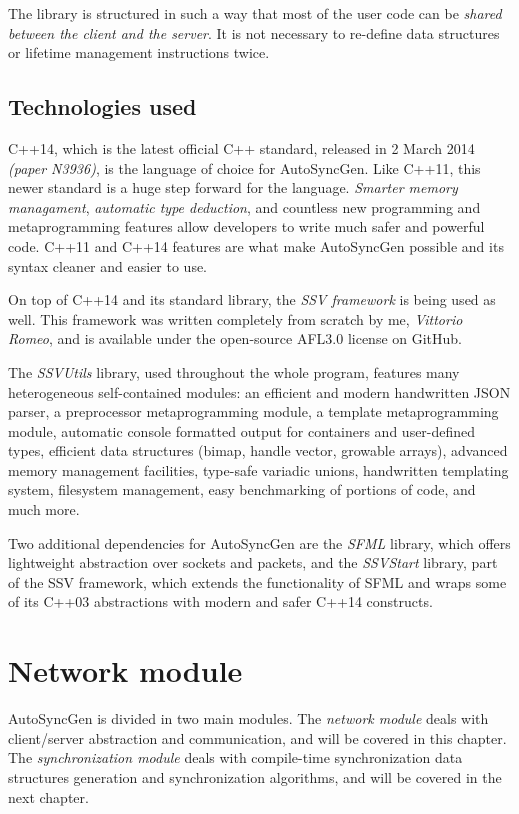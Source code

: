 \documentclass{report}
\begin{document}
            The library is structured in such a way that most of the user code can be \emph{shared between the client and the server}. 
            It is not necessary to re-define data structures or lifetime management instructions twice.

        \section{Technologies used}
            C++14, which is the latest official C++ standard, released in 2 March 2014 \emph{(paper N3936)}, is the language of choice for AutoSyncGen.
            Like C++11, this newer standard is a huge step forward for the language. \emph{Smarter memory managament}, \emph{automatic type deduction}, and countless new programming and metaprogramming features allow developers to write much safer and powerful code.
            C++11 and C++14 features are what make AutoSyncGen possible and its syntax cleaner and easier to use.

            On top of C++14 and its standard library, the \emph{SSV framework} is being used as well. This framework was written completely from scratch by me, \emph{Vittorio Romeo}, and is available under the open-source AFL3.0 license on GitHub.

            The \emph{SSVUtils} library, used throughout the whole program, features many heterogeneous self-contained modules: an efficient and modern handwritten JSON parser, a preprocessor metaprogramming module, a template metaprogramming module, automatic console formatted output for containers and user-defined types, efficient data structures (bimap, handle vector, growable arrays), advanced memory management facilities, type-safe variadic unions, handwritten templating system, filesystem management, easy benchmarking of portions of code, and much more.

            Two additional dependencies for AutoSyncGen are the \emph{SFML} library, which offers lightweight abstraction over sockets and packets, and the \emph{SSVStart} library, part of the SSV framework, which extends the functionality of SFML and wraps some of its C++03 abstractions with modern and safer C++14 constructs.
    
    \newpage

    \chapter{Network module}
        AutoSyncGen is divided in two main modules. 
        The \emph{network module} deals with client/server abstraction and communication, and will be covered in this chapter.
        The \emph{synchronization module} deals with compile-time synchronization data structures generation and synchronization algorithms, and will be covered in the next chapter.
\end{document}

